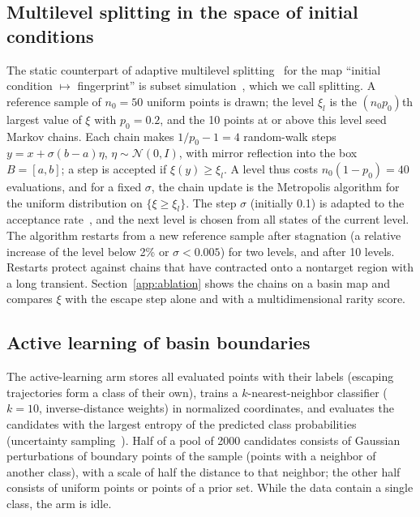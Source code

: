 \subsection{Multilevel splitting in the space of initial conditions}\label{sec:sus}

The static counterpart of adaptive multilevel splitting~\cite{CerouGuyader2007} for the map ``initial condition $\mapsto$ fingerprint'' is subset simulation~\cite{AuBeck2001}, which we call splitting. A reference sample of $n_0=50$ uniform points is drawn; the level $\xi_l$ is the $(n_0p_0)$th largest value of $\xi$ with $p_0=0.2$, and the 10 points at or above this level seed Markov chains. Each chain makes $1/p_0-1=4$ random-walk steps $y=x+\sigma(b-a)\eta$, $\eta\sim\mathcal N(0,I)$, with mirror reflection into the box $B=[a,b]$; a step is accepted if $\xi(y)\ge\xi_l$. A level thus costs $n_0(1-p_0)=40$ evaluations, and for a fixed $\sigma$, the chain update is the Metropolis algorithm for the uniform distribution on $\{\xi\ge\xi_l\}$. The step $\sigma$ (initially 0.1) is adapted to the acceptance rate~\cite{Papaioannou2015}, and the next level is chosen from all states of the current level. The algorithm restarts from a new reference sample after stagnation (a relative increase of the level below 2\% or $\sigma<0.005$) for two levels, and after 10 levels. Restarts protect against chains that have contracted onto a nontarget region with a long transient. Section~\ref{app:ablation} shows the chains on a basin map and compares $\xi$ with the escape step alone and with a multidimensional rarity score.

\subsection{Active learning of basin boundaries}\label{sec:al}

The active-learning arm stores all evaluated points with their labels (escaping trajectories form a class of their own), trains a $k$-nearest-neighbor classifier ($k=10$, inverse-distance weights) in normalized coordinates, and evaluates the candidates with the largest entropy of the predicted class probabilities (uncertainty sampling~\cite{Settles2012}). Half of a pool of 2000 candidates consists of Gaussian perturbations of boundary points of the sample (points with a neighbor of another class), with a scale of half the distance to that neighbor; the other half consists of uniform points or points of a prior set. While the data contain a single class, the arm is idle.

